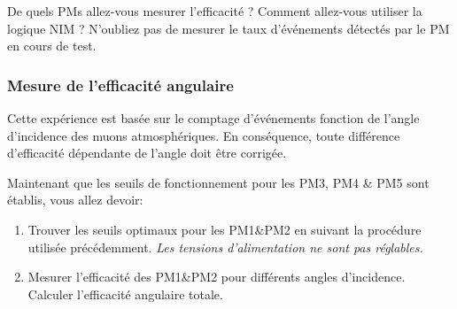 De quels PMs allez-vous mesurer l'efficacité ?
Comment allez-vous utiliser la logique NIM ?
N'oubliez pas de mesurer le taux d'événements détectés par le PM en cours de test.


\subsubsection{Mesure de l'efficacité angulaire}

Cette expérience est basée sur le comptage d'événements fonction de l'angle d'incidence des muons atmosphériques.
En conséquence, toute différence d'efficacité dépendante de l'angle doit être corrigée.

Maintenant que les seuils de fonctionnement pour les PM3, PM4 \& PM5 sont établis, vous allez devoir:
\begin{enumerate}
    \item Trouver les seuils optimaux pour les PM1\&PM2 en suivant la procédure utilisée précédemment. \textit{Les tensions d'alimentation ne sont pas réglables.}
    \item Mesurer l'efficacité des PM1\&PM2 pour différents angles d'incidence. Calculer l'efficacité angulaire totale.
\end{enumerate}

